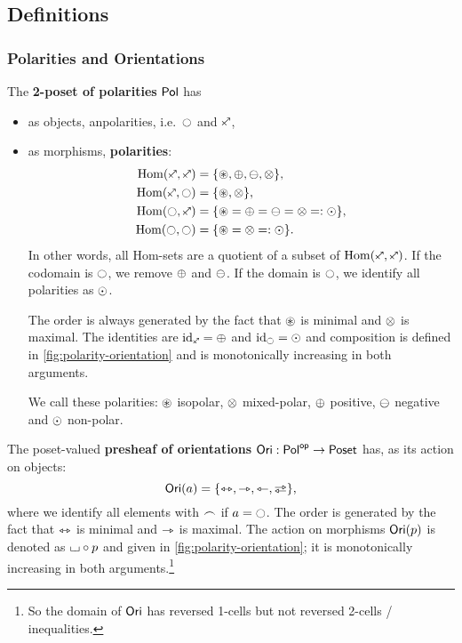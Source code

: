 \documentclass[a4paper]{memoir}
\begin{document}
\subsection{Definitions}
\subsubsection{Polarities and Orientations}
\begin{definition} \label{def:polarity-cat}
	The \textbf{2-poset of polarities} ${\mathsf{Pol}}$ has
	\begin{itemize}
		\item as objects, anpolarities, i.e.\ $\npolar$ and $\ypolar$,
		\item as morphisms, \textbf{polarities}:
		\begin{align*}
			\Hom(\ypolar, \ypolar) &= \accol{\isopol, \pospol, \negpol, \mixpol}, \\
			\Hom(\ypolar, \npolar) &= \accol{\isopol, \mixpol}, \\
			\Hom(\npolar, \ypolar) &= \accol{\isopol = \pospol = \negpol = \mixpol =: \nonpol}, \\
			\Hom(\npolar, \npolar) &= \accol{\isopol = \mixpol =: \nonpol}.
		\end{align*}
		In other words, all Hom-sets are a quotient of a subset of $\Hom(\ypolar, \ypolar)$. If the codomain is $\npolar$, we remove ${\oplus}$ and ${\ominus}$. If the domain is $\npolar$, we identify all polarities as ${\odot}$.
		
		The order is always generated by the fact that ${\oast}$ is minimal and ${\otimes}$ is maximal.
		The identities are $\id_\ypolar = \pospol$ and $\id_\npolar = \nonpol$ and composition is defined in \cref{fig:polarity-orientation} and is monotonically increasing in both arguments.
		
		We call these polarities: ${\oast}$ isopolar, ${\otimes}$ mixed-polar, ${\oplus}$ positive, ${\ominus}$ negative and ${\odot}$ non-polar.
	\end{itemize}
\end{definition}
\begin{definition} \label{def:orientation-psh}
	The poset-valued \textbf{presheaf of orientations} ${\mathsf{Ori}} : {\mathsf{Pol}}^{\mathsf{op}} \to {\mathsf{Poset}}$ has, as its action on objects:
	\[
		\orisymbol(a) = \accol{\equijetsym, \jetsym, \tejsym, \infrajetsym},
	\]
	where we identify all elements with ${\frown}$ if $a = \npolar$.
	The order is generated by the fact that ${\leftrightarrowtriangle}$ is minimal and ${\rightarrowtriangle}$ is maximal.
	The action on morphisms ${\mathsf{Ori}}(p)$ is denoted as ${\llcorner\hspace{-.4ex}\lrcorner} \circ p$ and given in \cref{fig:polarity-orientation}; it is monotonically increasing in both arguments.\footnote{So the domain of ${\mathsf{Ori}}$ has reversed 1-cells but not reversed 2-cells / inequalities.}
\end{definition}
\end{document}
